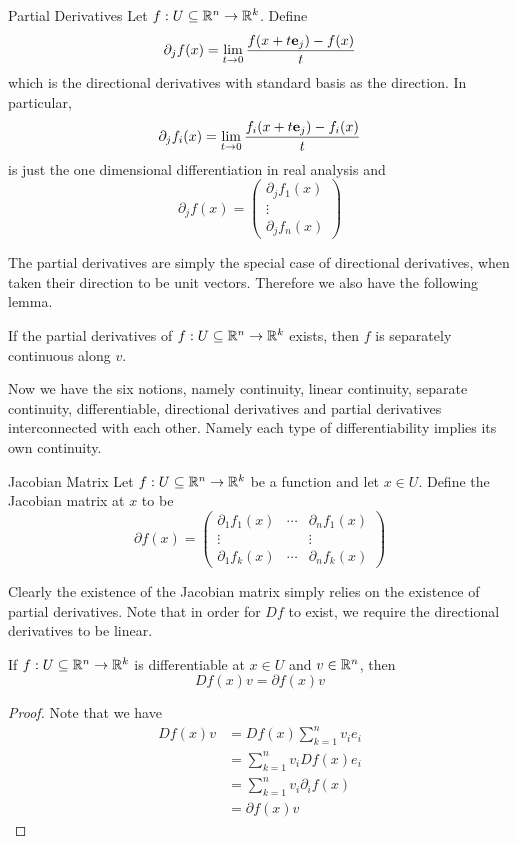 \documentclass[a4paper]{article}
\begin{document}
\begin{defn}{Partial Derivatives}{} Let $f:U\subseteq\mathbb{R}^n\to\mathbb{R}^k$. Define $$\partial_jf(x)=\lim_{t\to0}\frac{f(x +t\vb{e}_j)-f(x)}{t}$$ which is the directional derivatives with standard basis as the direction. In particular, $$\partial_jf_i(x)=\lim_{t\to0}\frac{f_i(x +t\vb{e}_j)-f_i(x )}{t}$$ is just the one dimensional differentiation in real analysis and $$\partial_jf(x)=\begin{pmatrix}
\partial_jf_1(x)\\
\vdots\\
\partial_jf_n(x)
\end{pmatrix}$$
\end{defn}

The partial derivatives are simply the special case of directional derivatives, when taken their direction to be unit vectors. Therefore we also have the following lemma. 

\begin{prp} If the partial derivatives of $f:U\subseteq\mathbb{R}^n\to\mathbb{R}^k$ exists, then $f$ is separately continuous along $v$. 
\end{prp}

Now we have the six notions, namely continuity, linear continuity, separate continuity, differentiable, directional derivatives and partial derivatives interconnected with each other. Namely each type of differentiability implies its own continuity. 

\begin{defn}{Jacobian Matrix}{} Let $f:U\subseteq\mathbb{R}^n\to\mathbb{R}^k$ be a function and let $x\in U$. Define the Jacobian matrix at $x$ to be $$\partial f(x)=\begin{pmatrix}
\partial_1f_1(x) & \cdots & \partial_nf_1(x)\\
\vdots & & \vdots\\
\partial_1f_k(x) & \cdots & \partial_nf_k(x)
\end{pmatrix}$$
\end{defn}

Clearly the existence of the Jacobian matrix simply relies on the existence of partial derivatives. Note that in order for $Df$ to exist, we require the directional derivatives to be linear. 

\begin{thm}{}{} If $f:U\subseteq\mathbb{R}^n\to\mathbb{R}^k$ is differentiable at $x\in U$ and $v\in\mathbb{R}^n$, then $$Df(x)v=\partial f(x)v$$ 
\begin{proof}
Note that we have
\begin{align*}
Df(x)v&=Df(x)\sum_{k=1}^nv_ie_i\\
&=\sum_{k=1}^nv_iDf(x)e_i\\
&=\sum_{k=1}^nv_i\partial_if(x)\\
&=\partial f(x)v
\end{align*}
\end{proof}
\end{thm}
\end{document}
